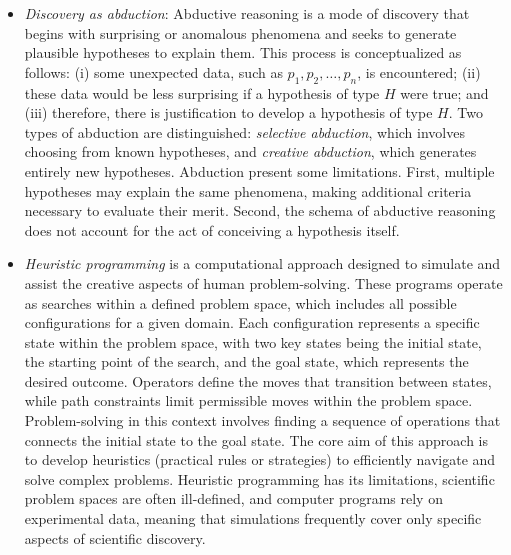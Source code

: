 \begin{itemize}

\item \emph{Discovery as abduction}: Abductive reasoning is a mode of discovery that begins with surprising or anomalous phenomena and seeks to generate plausible hypotheses to explain them. This process is conceptualized as follows: (i) some unexpected data, such as $p_1, p_2, \ldots, p_n$, is encountered; (ii) these data would be less surprising if a hypothesis of type $H$ were true; and (iii) therefore, there is justification to develop a hypothesis of type $H$. Two types of abduction are distinguished: \emph{selective abduction}, which involves choosing from known hypotheses, and \emph{creative abduction}, which generates entirely new hypotheses. Abduction present some limitations. First, multiple hypotheses may explain the same phenomena, making additional criteria necessary to evaluate their merit. Second, the schema of abductive reasoning does not account for the act of conceiving a hypothesis itself.

\item \emph{Heuristic programming} is a computational approach designed to simulate and assist the creative aspects of human problem-solving. These programs operate as searches within a defined problem space, which includes all possible configurations for a given domain. Each configuration represents a specific state within the problem space, with two key states being the initial state, the starting point of the search, and the goal state, which represents the desired outcome. Operators define the moves that transition between states, while path constraints limit permissible moves within the problem space. Problem-solving in this context involves finding a sequence of operations that connects the initial state to the goal state. The core aim of this approach is to develop heuristics (practical rules or strategies) to efficiently navigate and solve complex problems. Heuristic programming has its limitations, scientific problem spaces are often ill-defined, and computer programs rely on experimental data, meaning that simulations frequently cover only specific aspects of scientific discovery.

\end{itemize}

